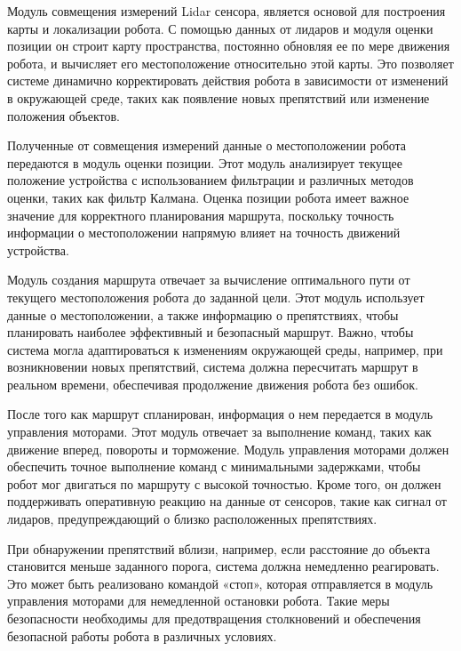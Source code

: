 Модуль совмещения измерений Lidar сенсора, является основой для построения карты
и локализации робота. С помощью данных от лидаров и модуля оценки позиции он
строит карту пространства, постоянно обновляя ее по мере движения робота, и
вычисляет его местоположение относительно этой карты. Это позволяет системе
динамично корректировать действия робота в зависимости от изменений в окружающей
среде, таких как появление новых препятствий или изменение положения объектов.

Полученные от совмещения измерений данные о местоположении робота передаются в модуль оценки
позиции. Этот модуль анализирует текущее положение устройства с использованием
фильтрации и различных методов оценки, таких как фильтр Калмана. Оценка позиции
робота имеет важное значение для корректного планирования маршрута, поскольку
точность информации о местоположении напрямую влияет на точность движений
устройства.

Модуль создания маршрута отвечает за вычисление оптимального пути от текущего
местоположения робота до заданной цели. Этот модуль использует данные о
местоположении, а также информацию о препятствиях, чтобы планировать наиболее
эффективный и безопасный маршрут. Важно, чтобы система могла адаптироваться к
изменениям окружающей среды, например, при возникновении новых препятствий,
система должна пересчитать маршрут в реальном времени, обеспечивая продолжение
движения робота без ошибок.

После того как маршрут спланирован, информация о нем передается в модуль
управления моторами. Этот модуль отвечает за выполнение команд, таких как
движение вперед, повороты и торможение. Модуль управления моторами должен
обеспечить точное выполнение команд с минимальными задержками, чтобы робот мог
двигаться по маршруту с высокой точностью. Кроме того, он должен поддерживать
оперативную реакцию на данные от сенсоров, такие как сигнал от лидаров,
предупреждающий о близко расположенных препятствиях.

При обнаружении препятствий вблизи, например, если расстояние до объекта
становится меньше заданного порога, система должна немедленно реагировать. Это
может быть реализовано командой «стоп», которая отправляется в модуль управления
моторами для немедленной остановки робота. Такие меры безопасности необходимы
для предотвращения столкновений и обеспечения безопасной работы робота в
различных условиях.


